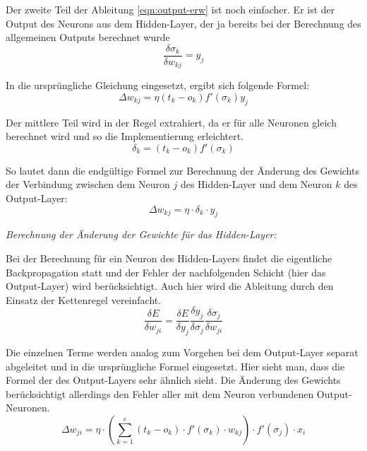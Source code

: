 Der zweite Teil der Ableitung \ref{eqn:output-erw} ist noch einfacher. Er ist der Output des Neurons aus dem Hidden-Layer, der ja bereits bei der Berechnung des allgemeinen Outputs berechnet wurde
\begin{equation}
\frac{\delta\sigma_k}{\delta w_{kj}}=y_j
\end{equation}

In die ursprüngliche Gleichung eingesetzt, ergibt sich folgende Formel:
\begin{equation}
\Delta w_{kj} = \eta (t_k - o_k) f'(\sigma_k)y_j
\end{equation}

Der mittlere Teil wird in der Regel extrahiert, da er für alle Neuronen gleich berechnet wird und so die Implementierung erleichtert.
\begin{equation}
\delta_k = (t_k - o_k) f'(\sigma_k)
\end{equation}

So lautet dann die endgültige Formel zur Berechnung der Änderung des Gewichts der Verbindung zwischen dem Neuron $j$ des Hidden-Layer und dem Neuron $k$ des Output-Layer:
\begin{equation}
\Delta w_{kj} = \eta\cdot \delta_k \cdot y_j
\end{equation}

\emph{Berechnung der Änderung der Gewichte für das Hidden-Layer:}

Bei der Berechnung für ein Neuron des Hidden-Layers findet die eigentliche Backpropagation statt und der Fehler der nachfolgenden Schicht (hier das Output-Layer) wird berücksichtigt. Auch hier wird die Ableitung durch den Einsatz der Kettenregel vereinfacht.
\begin{equation}
\frac{\delta E}{\delta w_{ji}} = \frac{\delta E}{\delta y_j} \frac{\delta y_j}{\delta\sigma_j}\frac{\delta\sigma_j}{\delta w_{ji}}
\end{equation}

Die einzelnen Terme werden analog zum Vorgehen bei dem Output-Layer separat abgeleitet und in die ursprüngliche Formel eingesetzt. Hier sieht man, dass die Formel der des Output-Layers sehr ähnlich sieht. Die Änderung des Gewichts berücksichtigt allerdings den Fehler aller mit dem Neuron verbundenen Output-Neuronen.
\begin{equation}
\Delta w_{ji} = \eta \cdot \left(\sum_{k=1}^{c}(t_k-o_k)\cdot f'(\sigma_k)\cdot w_{kj}\right) \cdot f'(\sigma_j) \cdot x_i
\end{equation}

